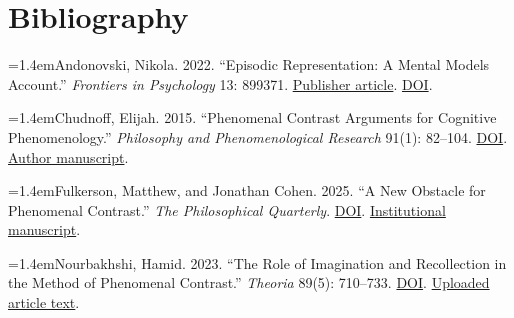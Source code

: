 \section*{Bibliography}\begingroup\fontsize{10}{13}\selectfont\setlength{\parindent}{0pt}\setlength{\parskip}{0.55em}\raggedright

\hypertarget{ref:andonovski2022}{}\hangindent=1.4em\noindent Andonovski, Nikola. 2022. “Episodic Representation: A Mental Models Account.” \emph{Frontiers in Psychology} 13: 899371. \href{https://www.frontiersin.org/journals/psychology/articles/10.3389/fpsyg.2022.899371/full}{Publisher article}. \href{https://doi.org/10.3389/fpsyg.2022.899371}{DOI}.

\hypertarget{ref:chudnoff2015}{}\hangindent=1.4em\noindent Chudnoff, Elijah. 2015. “Phenomenal Contrast Arguments for Cognitive Phenomenology.” \emph{Philosophy and Phenomenological Research} 91(1): 82–104. \href{https://doi.org/10.1111/phpr.12177}{DOI}. \href{https://philarchive.org/archive/CHUPCA-4}{Author manuscript}.

\hypertarget{ref:fulkerson2025}{}\hangindent=1.4em\noindent Fulkerson, Matthew, and Jonathan Cohen. 2025. “A New Obstacle for Phenomenal Contrast.” \emph{The Philosophical Quarterly}. \href{https://doi.org/10.1093/pq/pqaf009}{DOI}. \href{https://escholarship.org/content/qt9zc6d603/qt9zc6d603.pdf}{Institutional manuscript}.

\hypertarget{ref:nourbakhshi2023}{}\hangindent=1.4em\noindent Nourbakhshi, Hamid. 2023. “The Role of Imagination and Recollection in the Method of Phenomenal Contrast.” \emph{Theoria} 89(5): 710–733. \href{https://doi.org/10.1111/theo.12489}{DOI}. \href{https://www.researchgate.net/publication/373946133_The_role_of_imagination_and_recollection_in_the_method_of_phenomenal_contrast}{Uploaded article text}.
\endgroup
